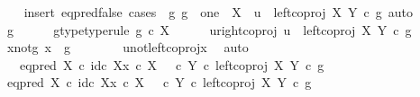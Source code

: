 \begin{isabellebody}
\ \ \isamarkupfalse%
\ {\isacharparenleft}{\kern0pt}insert\ eq{\isacharunderscore}{\kern0pt}pred{\isacharunderscore}{\kern0pt}false{\isacharcomma}{\kern0pt}\ cases\ {\isachardoublequoteopen}{\isasymexists}\ g{\isachardot}{\kern0pt}\ g\ {\isacharcolon}{\kern0pt}\ one\ {\isasymrightarrow}\ X\ {\isasymand}\ u\ {\isacharequal}{\kern0pt}\ left{\isacharunderscore}{\kern0pt}coproj\ X\ Y\ {\isasymcirc}\isactrlsub c\ g{\isachardoublequoteclose}{\isacharcomma}{\kern0pt}\ auto{\isacharparenright}{\kern0pt}\ \ \isanewline
\ \ \ \ \isamarkupfalse%
\ g\isanewline
\ \ \ \ \isamarkupfalse%
\ g{\isacharunderscore}{\kern0pt}type{\isacharbrackleft}{\kern0pt}type{\isacharunderscore}{\kern0pt}rule{\isacharbrackright}{\kern0pt}{\isacharcolon}{\kern0pt}\ {\isachardoublequoteopen}g\ {\isasymin}\isactrlsub c\ X{\isachardoublequoteclose}\isanewline
\ \ \ \ \isamarkupfalse%
\ u{\isacharunderscore}{\kern0pt}right{\isacharunderscore}{\kern0pt}coproj{\isacharcolon}{\kern0pt}\ {\isachardoublequoteopen}u\ {\isacharequal}{\kern0pt}\ left{\isacharunderscore}{\kern0pt}coproj\ X\ Y\ {\isasymcirc}\isactrlsub c\ g{\isachardoublequoteclose}\isanewline
\ \ \ \ \isamarkupfalse%
\ \isamarkupfalse%
\ x{\isacharunderscore}{\kern0pt}not{\isacharunderscore}{\kern0pt}g{\isacharcolon}{\kern0pt}\ {\isachardoublequoteopen}x\ {\isasymnoteq}\ g{\isachardoublequoteclose}\isanewline
\ \ \ \ \ \ \isamarkupfalse%
\ u{\isacharunderscore}{\kern0pt}not{\isacharunderscore}{\kern0pt}left{\isacharunderscore}{\kern0pt}coproj{\isacharunderscore}{\kern0pt}x\ \isamarkupfalse%
\ auto\isanewline
\ \ \ \ \isamarkupfalse%
\ {\isachardoublequoteopen}{\isasymf}\ {\isacharequal}{\kern0pt}\ {\isacharparenleft}{\kern0pt}eq{\isacharunderscore}{\kern0pt}pred\ X\ {\isasymcirc}\isactrlsub c\ {\isasymlangle}id\isactrlsub c\ X{\isacharcomma}{\kern0pt}x\ {\isasymcirc}\isactrlsub c\ {\isasymbeta}\isactrlbsub X\isactrlesub {\isasymrangle}{\isacharparenright}{\kern0pt}\ {\isasymamalg}\ {\isacharparenleft}{\kern0pt}{\isasymf}\ {\isasymcirc}\isactrlsub c\ {\isasymbeta}\isactrlbsub Y\isactrlesub {\isacharparenright}{\kern0pt}\ {\isasymcirc}\isactrlsub c\ left{\isacharunderscore}{\kern0pt}coproj\ X\ Y\ {\isasymcirc}\isactrlsub c\ g{\isachardoublequoteclose}\isanewline
\ \ \ \ \isamarkupfalse%
\ {\isacharminus}{\kern0pt}\isanewline
\ \ \ \ \ \ \isamarkupfalse%
\ {\isachardoublequoteopen}{\isacharparenleft}{\kern0pt}eq{\isacharunderscore}{\kern0pt}pred\ X\ {\isasymcirc}\isactrlsub c\ {\isasymlangle}id\isactrlsub c\ X{\isacharcomma}{\kern0pt}x\ {\isasymcirc}\isactrlsub c\ {\isasymbeta}\isactrlbsub X\isactrlesub {\isasymrangle}{\isacharparenright}{\kern0pt}\ {\isasymamalg}\ {\isacharparenleft}{\kern0pt}{\isasymf}\ {\isasymcirc}\isactrlsub c\ {\isasymbeta}\isactrlbsub Y\isactrlesub {\isacharparenright}{\kern0pt}\ {\isasymcirc}\isactrlsub c\ left{\isacharunderscore}{\kern0pt}coproj\ X\ Y\ {\isasymcirc}\isactrlsub c\ g\isanewline

\end{isabellebody}
